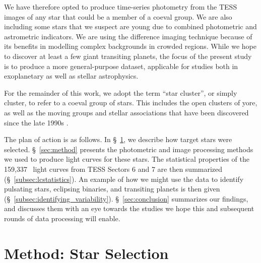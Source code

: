 \documentclass[12pt,twocolumn,tighten]{aastex62}
\newcommand{\numberlcs}{159{,}337\ } %
\begin{document}
We have therefore opted to produce time-series photometry from the
TESS images of any star that could be a member of a coeval group.  We
are also including some stars that we suspect are young due to
combined photometric and astrometric indicators.  We are using the
difference imaging technique because of its benefits in modelling
complex backgrounds in crowded regions.  While we hope to
discover at least a few giant transiting planets, the focus of the
present study is to produce a more general-purpose dataset,
applicable for studies both in exoplanetary as well as stellar
astrophysics.

For the remainder of this work, we adopt the term ``star cluster'', or
simply cluster, to refer to a coeval group of stars.  This includes
the open clusters of yore, as well as the moving groups and stellar
associations that have been discovered since the late
1990s \citep{zuckerman_young_2004}. 

The plan of action is as follows. In \S~\ref{sec:starselection}, we
describe how target stars were selected. \S~\ref{sec:method} presents
the photometric and image processing methods we used to produce light
curves for these stars.  The statistical properties of the \numberlcs
light curves from TESS Sectors 6 and 7 are then summarized
(\S~\ref{subsec:lcstatistics}).  
An example of how we might use the data to identify pulsating
stars, eclipsing binaries, and transiting planets is then
given
(\S~\ref{subsec:identifying_variability}). 
\S~\ref{sec:conclusion}
summarizes our findings, and discusses them with an eye towards
the studies we hope this and subsequent rounds of data processing
will enable.


\section{Method: Star Selection}
\label{sec:starselection}
\end{document}
